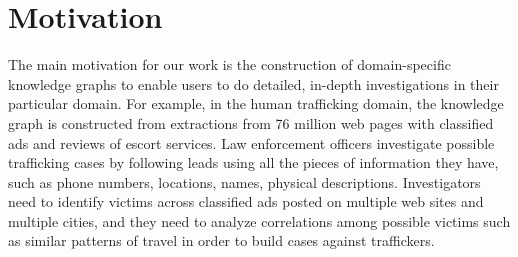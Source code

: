 \section{Motivation}
\label{sec:motivation}
The main motivation for our work is the construction of domain-specific knowledge graphs to enable users to do detailed, in-depth investigations in their particular domain.
For example, in the human trafficking domain, the knowledge graph is constructed from extractions from 76 million web pages with classified ads and reviews of escort services.
Law enforcement officers investigate possible trafficking cases by following leads using all the pieces of information they have, such as phone numbers, locations, names, physical descriptions.
Investigators need to identify victims across classified ads posted on multiple web sites and multiple cities, and they need to analyze correlations among possible victims such as similar patterns of travel in order to build cases against traffickers.